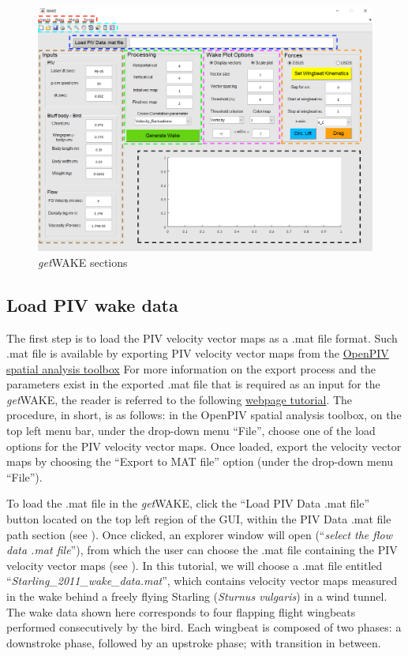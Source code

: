 \documentclass[12pt,a4paper]{article}
\begin{document}
\begin{figure}[ht!]
	\centering
	\includegraphics[width=\textwidth]{openwindow-marked}
	\caption{\textit{get}WAKE sections}
	\label{fig:GUI-sections}
\end{figure}	



\subsection{Load PIV wake data}

The first step is to load the PIV velocity vector maps as a .mat file format. 
Such .mat file is available by exporting PIV velocity vector maps from the \href{https://github.com/OpenPIV/openpiv-spatial-analysis-toolbox}{OpenPIV spatial analysis toolbox} 
For more information on the export process and the parameters exist in the exported .mat file that is required as an input for the \textit{get}WAKE, the reader is referred to the following \href{https://github.com/OpenPIV/openpiv-spatial-analysis-toolbox/blob/master/docs/tutorial.rst}{webpage tutorial}.
The procedure, in short, is as follows: in the OpenPIV spatial analysis toolbox, on the top left menu bar, under the drop-down menu ``File'', choose one of the load options for the PIV velocity vector maps. Once loaded, export the velocity vector maps by choosing the ``Export to MAT file'' option (under the drop-down menu ``File'').

To load the .mat file in the \textit{get}WAKE, click the ``Load PIV Data .mat file'' button located on the top left region of the GUI, within the PIV Data .mat file path section (see ). 
Once clicked, an explorer window will open (``\textit{select the flow data .mat file}''), from which the user can choose the .mat file containing the PIV velocity vector maps (see ). 
In this tutorial, we will choose a .mat file entitled ``\textit{Starling\_2011\_wake\_data.mat}'', which contains velocity vector maps measured in the wake behind a freely flying Starling (\textit{Sturnus vulgaris}) in a wind tunnel. 
The wake data shown here corresponds to four flapping flight wingbeats performed consecutively by the bird. 
Each wingbeat is composed of two phases: a downstroke phase, followed by an upstroke phase; with transition in between.
\end{document}
